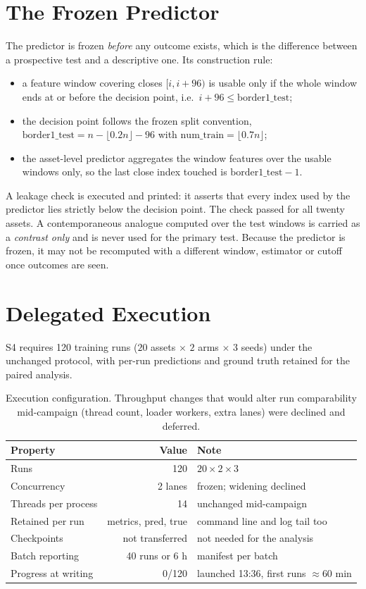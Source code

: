 \documentclass[conference]{IEEEtran}
\begin{document}
\section{The Frozen Predictor}
\label{sec:pred}

The predictor is frozen \emph{before} any outcome exists, which is the difference between a
prospective test and a descriptive one. Its construction rule:

\begin{itemize}
\item a feature window covering closes $[i, i+96)$ is usable only if the whole window ends at or
before the decision point, i.e.\ $i+96 \le \mathrm{border1\_test}$;
\item the decision point follows the frozen split convention,
$\mathrm{border1\_test} = n - \lfloor 0.2n \rfloor - 96$ with $\mathrm{num\_train} = \lfloor 0.7n
\rfloor$;
\item the asset-level predictor aggregates the window features over the usable windows only, so the
last close index touched is $\mathrm{border1\_test} - 1$.
\end{itemize}

A leakage check is executed and printed: it asserts that every index used by the predictor lies
strictly below the decision point. The check passed for all twenty assets. A contemporaneous
analogue computed over the test windows is carried as a \emph{contrast only} and is never used for
the primary test. Because the predictor is frozen, it may not be recomputed with a different window,
estimator or cutoff once outcomes are seen.

\section{Delegated Execution}
\label{sec:exec}

S4 requires 120 training runs ($20$ assets $\times$ $2$ arms $\times$ $3$ seeds) under the unchanged
protocol, with per-run predictions and ground truth retained for the paired analysis.
\begin{table}[!t]
\centering
\footnotesize
\begin{tabular}{@{}lrl@{}}
\toprule
Property & Value & Note \\
\midrule
Runs & 120 & $20 \times 2 \times 3$ \\
Concurrency & 2 lanes & frozen; widening declined \\
Threads per process & 14 & unchanged mid-campaign \\
Retained per run & metrics, pred, true & command line and log tail too \\
Checkpoints & not transferred & not needed for the analysis \\
Batch reporting & 40 runs or 6 h & manifest per batch \\
Progress at writing & 0/120 & launched 13:36, first runs $\approx$60 min \\
\bottomrule
\end{tabular}
\caption{Execution configuration. Throughput changes that would alter run comparability mid-campaign
(thread count, loader workers, extra lanes) were declined and deferred.}
\label{tab:exec}
\end{table}
\end{document}
